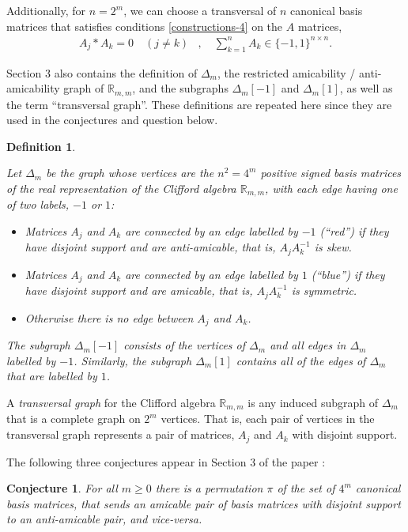 \documentclass[12pt,a4paper]{article}
\newcommand{\mb}[1]{\mathbb{#1}}
\newcommand{\R}{\mb{R}}
\newtheorem{Conjecture}{Conjecture}
\newtheorem{Definition}{Definition}
\begin{document}
Additionally, for $n=2^m$, we can choose a transversal of $n$ canonical basis matrices that
satisfies conditions \eqref{constructions-4} on the $A$ matrices,
%
\begin{align}
%
 A_j \ast A_k = 0 \quad (j \neq k)&, 
\quad 
\sum_{k=1}^n A_k \in \{-1,1\}^{n \times n}.
%
\label{A-property-2}
\end{align}

Section 3 also contains the definition of $\varDelta_m$, the restricted amicability / anti-amicability graph of $\R_{m,m}$,
and the subgraphs $\varDelta_m[-1]$ and $\varDelta_m[1]$, as well as the term ``transversal graph''.
These definitions are repeated here since they are used in the conjectures and question below.
\begin{Definition}\label{definition-delta}
\cite[p. 225]{Leo14Constructions}

Let $\varDelta_m$ be the graph whose vertices are the $n^2=4^m$ 
positive signed basis matrices of the real representation
of the Clifford algebra $\R_{m,m}$,
with each edge having one of two labels, $-1$ or $1$:
\begin{itemize}
\item 
Matrices $A_j$ and $A_k$ are connected by an edge labelled by $-1$ (``red'') if they have disjoint support and are anti-amicable,
that is, $A_j A_k^{-1}$ is skew.
\item 
Matrices $A_j$ and $A_k$ are connected by an edge labelled by $1$ (``blue'') if they have disjoint support and are amicable,
that is, $A_j A_k^{-1}$ is symmetric.
\item 
Otherwise there is no edge between $A_j$ and $A_k$.
\end{itemize}
The subgraph $\varDelta_m[-1]$ consists of the vertices of $\varDelta_m$ and all edges in $\varDelta_m$ labelled by $-1$.
Similarly, the subgraph $\varDelta_m[1]$ contains all of the edges of $\varDelta_m$ that are labelled by $1$.
\end{Definition}

A \emph{transversal graph} for the Clifford algebra $\R_{m,m}$
is any induced subgraph of $\varDelta_m$ that is a complete graph on $2^m$ vertices.
That is, each pair of vertices in the transversal graph represents a pair of matrices,
$A_j$ and $A_k$ with disjoint support.

The following three conjectures appear in Section 3 of the paper \cite{Leo14Constructions}:

\begin{Conjecture}\label{conjecture-1}
%
For all $m \geqslant 0$ there is a permutation $\pi$ of the set of $4^m$ canonical basis matrices,
that sends an amicable pair of basis matrices with disjoint support to an anti-amicable pair, and vice-versa.
%
\end{Conjecture}
\end{document}
